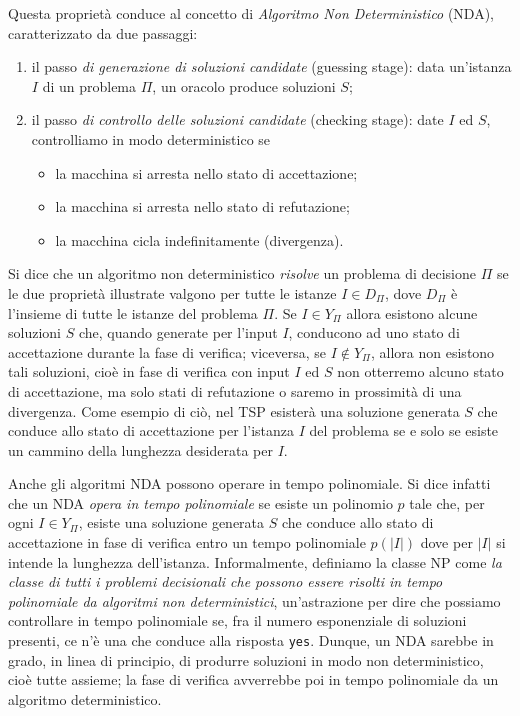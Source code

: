 \documentclass[10pt]{\classname}
\theoremstyle{newlinethm}
\theoremstyle{theorem}
\theoremstyle{definition}
\theoremstyle{definition}
\theoremstyle{definition}
\theoremstyle{definition}
\begin{document}
Questa proprietà conduce al concetto di \emph{Algoritmo Non Deterministico} (NDA), caratterizzato da due passaggi:
\begin{enumerate}
    \item il passo \emph{di generazione di soluzioni candidate} (guessing stage): data un'istanza $I$ di un problema $\Pi$, un oracolo produce soluzioni $S$;
    \item il passo \emph{di controllo delle soluzioni candidate} (checking stage): date $I$ ed $S$, controlliamo in modo deterministico se
\begin{itemize}
    \item la macchina si arresta nello stato di accettazione;
    \item la macchina si arresta nello stato di refutazione;
    \item la macchina cicla indefinitamente (divergenza).
\end{itemize}
\end{enumerate}
Si dice che un algoritmo non deterministico \emph{risolve} un problema di decisione $\Pi$ se le due proprietà illustrate valgono per tutte le istanze $I \in D_\Pi$, dove $D_\Pi$ è l'insieme di tutte le istanze del problema $\Pi$. Se $I\in Y_\Pi$ allora esistono alcune soluzioni $S$ che, quando generate per l'input $I$, conducono ad uno stato di accettazione durante la fase di verifica; viceversa, se $I \notin Y_\Pi$, allora non esistono tali soluzioni, cioè in fase di verifica con input $I$ ed $S$ non otterremo alcuno stato di accettazione, ma solo stati di refutazione o saremo in prossimità di una divergenza. Come esempio di ciò, nel TSP esisterà una soluzione generata $S$ che conduce allo stato di accettazione per l'istanza $I$ del problema se e solo se esiste un cammino della lunghezza desiderata per $I$.

Anche gli algoritmi NDA possono operare in tempo polinomiale. Si dice infatti che un NDA \emph{opera in tempo polinomiale} se esiste un polinomio $p$ tale che, per ogni $I \in Y_\Pi$, esiste una soluzione generata $S$ che conduce allo stato di accettazione in fase di verifica entro un tempo polinomiale $p(|I|)$ dove per $|I|$ si intende la lunghezza dell'istanza. Informalmente, definiamo la classe NP come \emph{la classe di tutti i problemi decisionali che possono essere risolti in tempo polinomiale da algoritmi non deterministici}, un'astrazione per dire che possiamo controllare in tempo polinomiale se, fra il numero esponenziale di soluzioni presenti, ce n'è una che conduce alla risposta \texttt{yes}. Dunque, un NDA sarebbe in grado, in linea di principio, di produrre soluzioni in modo non deterministico, cioè tutte assieme; la fase di verifica avverrebbe poi in tempo polinomiale da un algoritmo deterministico. 
\end{document}
